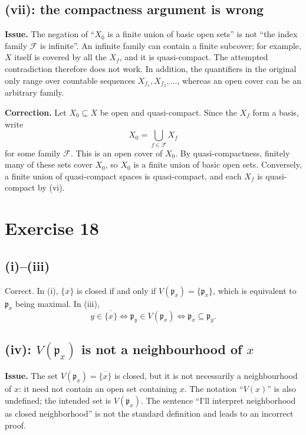 \documentclass[11pt]{article}
\newcommand{\fp}{\mathfrak p}
\begin{document}
\subsection*{(vii): the compactness argument is wrong}

\textbf{Issue.}  The negation of ``\(X_0\) is a finite union of basic open
sets'' is not ``the index family \(\mathcal F\) is infinite''.  An infinite
family can contain a finite subcover; for example, \(X\) itself is covered by
all the \(X_f\), and it is quasi-compact.  The attempted contradiction
therefore does not work.  In addition, the quantifiers in the original only
range over countable sequences \(X_{f_1},X_{f_2},\ldots\), whereas an open
cover can be an arbitrary family.

\textbf{Correction.}  Let \(X_0\subseteq X\) be open and quasi-compact.  Since
the \(X_f\) form a basis, write
\[
X_0=\bigcup_{f\in\mathcal F}X_f
\]
for some family \(\mathcal F\).  This is an open cover of \(X_0\).  By
quasi-compactness, finitely many of these sets cover \(X_0\), so \(X_0\) is a
finite union of basic open sets.  Conversely, a finite union of quasi-compact
spaces is quasi-compact, and each \(X_f\) is quasi-compact by (vi).

\section*{Exercise 18}

\subsection*{(i)--(iii)}
Correct.  In (i), \(\{x\}\) is closed if and only if
\(V(\fp_x)=\{\fp_x\}\), which is equivalent to \(\fp_x\) being maximal.
In (iii),
\[
y\in\overline{\{x\}}
\iff \fp_y\in V(\fp_x)
\iff \fp_x\subseteq\fp_y.
\]

\subsection*{(iv): \(V(\fp_x)\) is not a neighbourhood of \(x\)}

\textbf{Issue.}  The set \(V(\fp_x)=\overline{\{x\}}\) is closed, but it is
not necessarily a neighbourhood of \(x\): it need not contain an open set
containing \(x\).  The notation ``\(V(x)\)'' is also undefined; the intended
set is \(V(\fp_x)\).  The sentence ``I'll interpret neighborhood as closed
neighborhood'' is not the standard definition and leads to an incorrect
proof.
\end{document}
